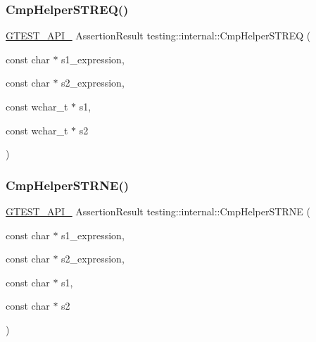 \mbox{\label{namespacetesting_1_1internal_ad40d557f9c157790160d6e4f2b0d9bab}} 
\subsubsection{\texorpdfstring{Cmp\+Helper\+S\+T\+R\+E\+Q()}{CmpHelperSTREQ()}\hspace{0.1cm}{\footnotesize\ttfamily [2/2]}}
{\footnotesize\ttfamily \hyperlink{gtest-port_8h_aa73be6f0ba4a7456180a94904ce17790}{G\+T\+E\+S\+T\+\_\+\+A\+P\+I\+\_\+} Assertion\+Result testing\+::internal\+::\+Cmp\+Helper\+S\+T\+R\+EQ (\begin{DoxyParamCaption}\item[{const char $\ast$}]{s1\+\_\+expression,  }\item[{const char $\ast$}]{s2\+\_\+expression,  }\item[{const wchar\+\_\+t $\ast$}]{s1,  }\item[{const wchar\+\_\+t $\ast$}]{s2 }\end{DoxyParamCaption})}

\mbox{\label{namespacetesting_1_1internal_a6b485231a046ff760844a0321c04870b}} 
\subsubsection{\texorpdfstring{Cmp\+Helper\+S\+T\+R\+N\+E()}{CmpHelperSTRNE()}\hspace{0.1cm}{\footnotesize\ttfamily [1/2]}}
{\footnotesize\ttfamily \hyperlink{gtest-port_8h_aa73be6f0ba4a7456180a94904ce17790}{G\+T\+E\+S\+T\+\_\+\+A\+P\+I\+\_\+} Assertion\+Result testing\+::internal\+::\+Cmp\+Helper\+S\+T\+R\+NE (\begin{DoxyParamCaption}\item[{const char $\ast$}]{s1\+\_\+expression,  }\item[{const char $\ast$}]{s2\+\_\+expression,  }\item[{const char $\ast$}]{s1,  }\item[{const char $\ast$}]{s2 }\end{DoxyParamCaption})}

